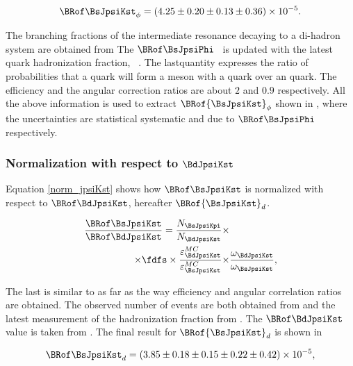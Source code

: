 \begin{equation}
  \centering
\BRof\BsJpsiKst_{\phi} = (4.25 \pm 0.20 \pm 0.13 \pm 0.36) \times 10^{-5}.
\label{Br_JpsiPhi}
\end{equation}

\noindent The branching fractions of the intermediate resonance decaying to a di-hadron system are obtained from \cite{PDG}
The $\BRof\BsJpsiPhi$~\cite{SheldonKK} is updated with the latest \bquark quark hadronization
fraction, \fdfs~\cite{LHCb-CONF-2013-011}. The lastquantity expresses the ratio of probabilities that a \bquark quark will form a meson with a
\dquark quark over an \squark quark. The efficiency and the angular correction ratios are about $2$ and $0.9$ respectively.
All the above information is used to extract $\BRof{\BsJpsiKst}_\phi$ shown in , where the uncertainties
are statistical systematic and due to  $\BRof\BsJpsiPhi$ respectively.

\subsubsection{Normalization with respect to $\BdJpsiKst$}
Equation \ref{norm_jpsiKst} shows how $\BRof\BsJpsiKst$ is normalized with respect to $\BRof\BdJpsiKst$, hereafter $\BRof{\BsJpsiKst}_d$.

\begin{align}
  \centering
\frac{\BRof\BsJpsiKst}{\BRof\BdJpsiKst} = \frac{N_{\BsJpsiKpi}}{N_{\BdJpsiKst}} \times & \nonumber \\
                                   \times \fdfs
                                   \times \frac{\varepsilon_{\BdJpsiKst}^{MC}}{\varepsilon_{\BsJpsiKst}^{MC}}
                                   \times &\frac{\omega_{\BdJpsiKst}}{\omega_{\BsJpsiKst}},
\label{norm_jpsiKst}
\end{align}

\noindent The last is similar to  as far as the way efficiency and angular correlation ratios are obtained.
The observed number of events are both obtained from  and the latest measurement of the hadronization
fraction from \cite{LHCb-CONF-2013-011}. The $\BRof\BdJpsiKst$ value is taken from \cite{Abe:2002haa}. The final result for $\BRof{\BsJpsiKst}_d$
is shown in 

\begin{equation}
  \centering
\BRof\BsJpsiKst_{d} = (3.85 \pm 0.18 \pm 0.15 \pm 0.22 \pm 0.42 )\times 10^{-5},
\label{Br_JpsiKst}
\end{equation}

